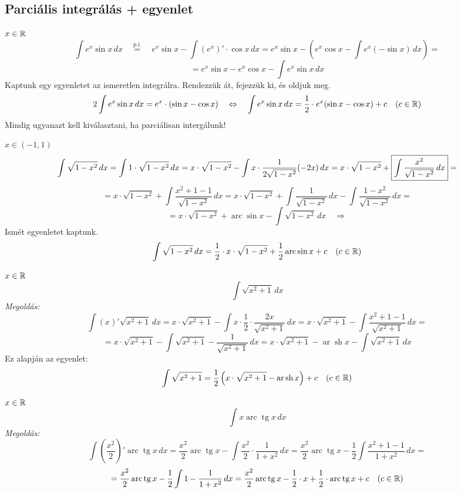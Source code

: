 \documentclass[a4paper,11.5pt]{article}
\DeclareMathOperator{\tg}{tg}
\DeclareMathOperator{\sh}{sh}
\DeclareMathOperator{\ar}{ar}
\DeclareMathOperator{\arc}{arc}
\begin{document}
	\subsection{Parciális integrálás + egyenlet}
	\begin{task}$x\in\mathbb{R}$
		\[ \int e^x\sin x\,dx\quad \overset{\text{p.i.}}{=}\quad e^x\sin x-\int (e^x)'\cdot\cos x\,dx=e^x\sin x-\left(e^x\cos x-\int e^x(-\sin x)\,dx\right)=\]
		\[=e^x\sin x-e^x\cos x-\int e^x\sin x\,dx \]
		Kaptunk egy egyenletet az ismeretlen integrálra. Rendezzük át, fejezzük ki, és oldjuk meg.
		\[ 2\int e^x\sin x\,dx=e^x\cdot(\sin x-\cos x)\quad \Leftrightarrow\quad \int e^x\sin x\,dx=\frac{1}{2}\cdot e^x(\sin x-\cos x)+c\quad (c\in\mathbb{R}) \]
		Mindig ugyanazt kell kiválasztani, ha parciálisan intergálunk!
	\end{task}
	\begin{task}$x\in(-1,1)$
		\[ \int\sqrt{1-x^2}\,dx=\int1\cdot\sqrt{1-x^2}\,dx=x\cdot\sqrt{1-x^2}-\int x\cdot\frac{1}{2\sqrt{1-x^2}}(-2x)\,dx=x\cdot\sqrt{1-x^2}+\text{\fbox{$\displaystyle \int\frac{x^2}{\sqrt{1-x^2}}\,dx$}}= \]
		\[=x\cdot\sqrt{1-x^2}+\int\frac{x^2+1-1}{\sqrt{1-x^2}}\,dx=x\cdot\sqrt{1-x^2}+\int\frac{1}{\sqrt{1-x^2}}\,dx-\int\frac{1-x^2}{\sqrt{1-x^2}}\,dx=\]
		\[=x\cdot\sqrt{1-x^2}+\arc\sin x-\int\sqrt{1-x^2}\,dx\quad \Rightarrow \]
		Ismét egyenletet kaptunk.
		\[ \int\sqrt{1-x^2}\,dx=\frac{1}{2} \cdot x\cdot\sqrt{1-x^2}+\frac{1}{2}\arc\sin x+c\quad (c\in\R) \]
	\end{task}
	\begin{exercise}$x\in\mathbb{R}$
		\[ \int\sqrt{x^2+1}\,dx \]
		\textit{Megoldás:}
		\[ \int(x)'\sqrt{x^2+1}\,dx=x\cdot\sqrt{x^2+1}-\int x\cdot\frac{1}{2}\cdot\frac{2x}{\sqrt{x^2+1}}\,dx=x\cdot\sqrt{x^2+1}-\int\frac{x^2+1-1}{\sqrt{x^2+1}}\,dx=\]
		\[=x\cdot\sqrt{x^2+1}-\int\sqrt{x^2+1}-\frac{1}{\sqrt{x^2+1}}\,dx=x\cdot\sqrt{x^2+1}-\ar\sh x - \int\sqrt{x^2+1}\,dx \]
		Ez alapján az egyenlet:
		\[ \int\sqrt{x^2+1}=\frac{1}{2}\left(x\cdot\sqrt{x^2+1}-\ar\sh x \right)+c\quad (c\in\R) \]
	\end{exercise}
	\begin{exercise}$x\in\mathbb{R}$
		\[ \int x\arc\tg x\,dx \]
		\textit{Megoldás:}
		\[ \int \left(\frac{x^2}{2}\right)'\arc\tg x\,dx=\frac{x^2}{2}\arc\tg x-\int\frac{x^2}{2}\cdot\frac{1}{1+x^2}\,dx=\frac{x^2}{2}\arc\tg x-\frac{1}{2}\int\frac{x^2+1-1}{1+x^2}\,dx= \]
		\[ =\frac{x^2}{2}\arc\tg x-\frac{1}{2}\int 1-\frac{1}{1+x^2}\,dx=\frac{x^2}{2}\arc\tg x-\frac{1}{2}\cdot x+\frac{1}{2}\cdot\arc\tg x+c\quad (c\in\R) \]
	\end{exercise}
\end{document}
